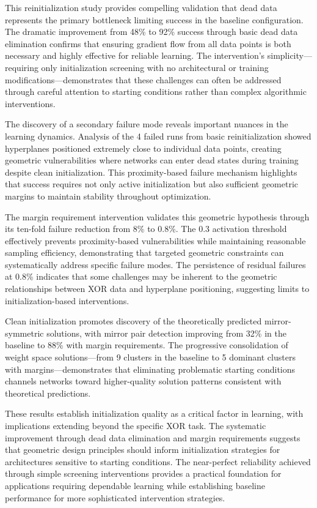 This reinitialization study provides compelling validation that dead data represents the primary bottleneck limiting success in the baseline configuration. The dramatic improvement from 48\% to 92\% success through basic dead data elimination confirms that ensuring gradient flow from all data points is both necessary and highly effective for reliable learning. The intervention's simplicity—requiring only initialization screening with no architectural or training modifications—demonstrates that these challenges can often be addressed through careful attention to starting conditions rather than complex algorithmic interventions.

The discovery of a secondary failure mode reveals important nuances in the learning dynamics. Analysis of the 4 failed runs from basic reinitialization showed hyperplanes positioned extremely close to individual data points, creating geometric vulnerabilities where networks can enter dead states during training despite clean initialization. This proximity-based failure mechanism highlights that success requires not only active initialization but also sufficient geometric margins to maintain stability throughout optimization.

The margin requirement intervention validates this geometric hypothesis through its ten-fold failure reduction from 8\% to 0.8\%. The 0.3 activation threshold effectively prevents proximity-based vulnerabilities while maintaining reasonable sampling efficiency, demonstrating that targeted geometric constraints can systematically address specific failure modes. The persistence of residual failures at 0.8\% indicates that some challenges may be inherent to the geometric relationships between XOR data and hyperplane positioning, suggesting limits to initialization-based interventions.

Clean initialization promotes discovery of the theoretically predicted mirror-symmetric solutions, with mirror pair detection improving from 32\% in the baseline to 88\% with margin requirements. The progressive consolidation of weight space solutions—from 9 clusters in the baseline to 5 dominant clusters with margins—demonstrates that eliminating problematic starting conditions channels networks toward higher-quality solution patterns consistent with theoretical predictions.

These results establish initialization quality as a critical factor in learning, with implications extending beyond the specific XOR task. The systematic improvement through dead data elimination and margin requirements suggests that geometric design principles should inform initialization strategies for architectures sensitive to starting conditions. The near-perfect reliability achieved through simple screening interventions provides a practical foundation for applications requiring dependable learning while establishing baseline performance for more sophisticated intervention strategies.

